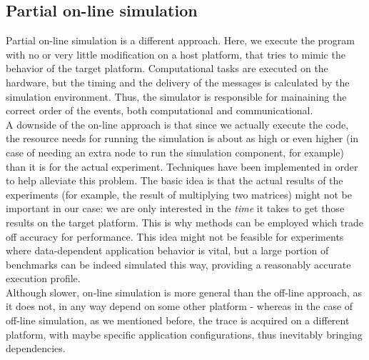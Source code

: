\subsection{Partial on-line simulation}
Partial on-line simulation is a different approach. Here, we execute
the program with no or very little modification on a host platform,
that tries to mimic the behavior of the target
platform.\cite{csgscq11} Computational tasks are executed on the
hardware, but the timing and the delivery of the messages is
calculated by the simulation environment. Thus, the simulator is
responsible for mainaining the correct order of the events, both
computational and communicational.\cite{bdglmqssv13}\\[0.3cm]
A downside of the on-line approach is that since we actually execute
the code, the resource needs for running the simulation is about as
high or even higher (in case of needing an extra node to run the
simulation component, for example) than it is for the actual
experiment. Techniques have been implemented in order to help
alleviate this problem. The basic idea is that
the actual results of the experiments (for example, the result of
multiplying two matrices) might not be important in our case: we are
only interested in the \emph{time} it takes to get those results on
the target platform. This is why methods can be employed which trade
off accuracy for performance. This idea might not be feasible for
experiments where data-dependent application behavior is
vital, but a large portion of benchmarks can be indeed simulated
this way, providing a reasonably accurate execution profile.\\[0.3cm]
Although slower, on-line simulation is more general than the off-line
approach, as it does not, in any way depend on some other platform -
whereas in the case of off-line simulation, as we mentioned before,
the trace is acquired on a different platform, with maybe specific
application configurations, thus inevitably bringing dependencies.

